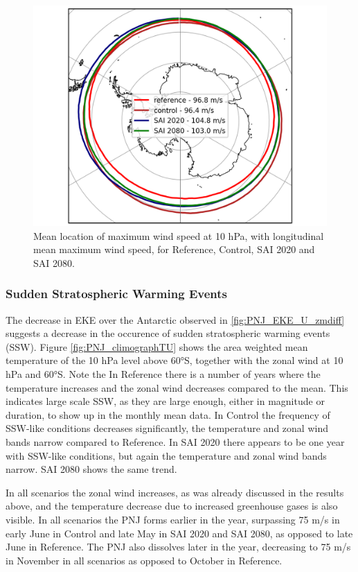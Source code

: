 \begin{figure}[H]
	\centering
	\includegraphics[width=0.48\linewidth]{images/PNJ_maxloc_latlon.png}
	\caption{Mean location of maximum wind speed at 10 hPa, with longitudinal mean maximum wind speed, for Reference, Control, SAI 2020 and SAI 2080.}
	\label{fig:PNJ_maxloc}
\end{figure}

\subsubsection{Sudden Stratospheric Warming Events}
The decrease in EKE over the Antarctic observed in \ref{fig:PNJ_EKE_U_zmdiff} suggests a decrease in the occurence of sudden stratospheric warming events (SSW). Figure \ref{fig:PNJ_climographTU} shows the area weighted mean temperature of the 10 hPa level above 60°S, together with the zonal wind at 10 hPa and 60°S. Note the  In Reference there is a number of years where the temperature increases and the zonal wind decreases compared to the mean. This indicates large scale SSW, as they are large enough, either in magnitude or duration, to show up in the monthly mean data. In Control the frequency of SSW-like conditions decreases significantly, the temperature and zonal wind bands narrow compared to Reference. In SAI 2020 there appears to be one year with SSW-like conditions, but again the temperature and zonal wind bands narrow. SAI 2080 shows the same trend. 

In all scenarios the zonal wind increases, as was already discussed in the results above, and the temperature decrease due to increased greenhouse gases is also visible. In all scenarios the PNJ forms earlier in the year, surpassing 75 m/s in early June in Control and late May in SAI 2020 and SAI 2080, as opposed to late June in Reference. The PNJ also dissolves later in the year, decreasing to 75 m/s in November in all scenarios as opposed to October in Reference.

